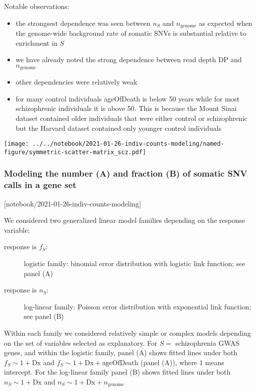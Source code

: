\documentclass[letterpaper]{article}
\begin{document}
Notable observations:
\begin{itemize}
	\item the strongsest dependence was seen between \(n_S\) and \(n_\mathrm{genome}\) as expected
		when the genome-wide background rate of somatic SNVs is
		substantial relative to enrichment in \(S\)
	\item we have already noted the strong dependence between read depth DP and
		\(n_\mathrm{genome}\)
        \item other dependencies were relatively weak
	\item for many control individuals ageOfDeath is below 50 years while for
		most schizophrenic individuals it is above 50.  This is
		because the Mount Sinai dataset contained older individuals
		that were either control or schizophrenic but the Harvard dataset contained
		only younger control individuals
\end{itemize}

\texttt{[image: ../../notebook/2021-01-26-indiv-counts-modeling/named-figure/symmetric-scatter-matrix\_scz.pdf]}


\subsubsection*{Modeling the number (A) and fraction (B) of somatic SNV calls in a gene set}

[notebook/2021-01-26-indiv-counts-modeling]

We considered two generalized linear model families depending on the response
variable:
\begin{description}
\item[response is \(f_S\):] logistic family: binomial error distribution with
	logistic link function; see panel (A)
\item[response is \(n_S\):] log-linear family: Poisson error distribution with exponential link function; see panel (B)
\end{description}

Within each family we considered relatively simple or complex models depending
on the set of variables selected as explanatory.  For \(S =\) schizophrenia
GWAS genes, and within the
logistic family, panel (A) shows fitted lines under both \(f_S \sim 1 +
	\mathrm{Dx}\) and \(f_S \sim 1 + \mathrm{Dx} + \mathrm{ageOfDeath}\)
(panel (A)), where \(1\) means intercept.  For the log-linear family panel (B)
shows fitted lines under both \(n_S \sim 1 + \mathrm{Dx}\) and \(n_S \sim 1 +
	\mathrm{Dx} + n_\mathrm{genome}\)
\end{document}
